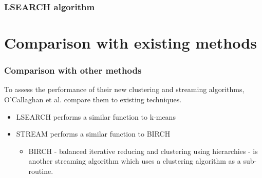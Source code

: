 \documentclass{beamer}
\begin{document}
\frame
{
  \frametitle{LSEARCH algorithm}

  

}


\section{Comparison with existing methods}
\frame
{
  \frametitle{Comparison with other methods}
  To assess the performance of their new clustering and streaming algorithms, O'Callaghan et al. compare them to existing techniques.
  
  \bigskip 
  \begin{itemize}
  \item{LSEARCH performs a similar function to k-means}
  \item{STREAM performs a similar function to BIRCH
    \begin{itemize}
      \item{BIRCH - balanced iterative reducing and clustering using hierarchies - is another streaming algorithm which uses a clustering algorithm as a sub-routine.}
    \end{itemize}
  }
  	     
  \end{itemize}
}
\end{document}
